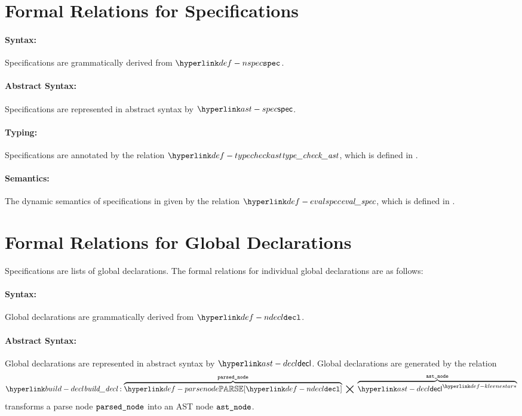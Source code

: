 \section{Formal Relations for Specifications\label{sec:Formal Relations for Specifications}}
\hypertarget{def-specificationterm}{}

\paragraph{Syntax:} Specifications are grammatically derived from $\Nspec$.
\paragraph{Abstract Syntax:} Specifications are represented in abstract syntax by $\spec$.
\paragraph{Typing:} Specifications are annotated by the relation $\typecheckast$, which is defined in
  .
\paragraph{Semantics:} The dynamic semantics of specifications in given by the relation $\evalspec$,
  which is defined in .

\section{Formal Relations for Global Declarations\label{sec:Formal Relations for Global Declarations}}
Specifications are lists of global declarations.
The formal relations for individual global declarations are as follows:

\paragraph{Syntax:} Global declarations are grammatically derived from $\Ndecl$.

\paragraph{Abstract Syntax:} Global declarations are represented in abstract syntax by $\decl$.
Global declarations are generated by the relation
\hypertarget{build-decl}{}
\[
  \builddecl : \overname{\parsenode{\Ndecl}}{\vparsednode} \;\aslrel\; \overname{\KleeneStar{\decl}}{\vastnode}
\]
transforms a parse node $\texttt{parsed\_node}$ into an AST node $\texttt{ast\_node}$.

